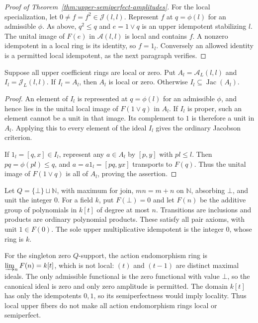 \begin{proof}[Proof of Theorem~\ref{thm:upper-semiperfect-amplitudes}]
For the local specialization, let $0\ne f=f^2\in\mathcal J(l,l)$.
Represent $f$ at $q=\phi(l)$ for an admissible $\phi$. As above,
$q^2\leq q$ and $e=1\vee q$ is an upper idempotent stabilizing
$l$. The unital image of $F(e)$ in $\mathcal A(l,l)$ is local
and contains $f$. A nonzero idempotent in a local ring is its
identity, so $f=1_l$. Conversely an allowed identity is a
permitted local idempotent, as the next paragraph verifies.
\end{proof}

\begin{corollary}
\label{cor:upper-local-diagonal}
Suppose all upper coefficient rings are local or zero. Put
$A_l=\mathcal A_L(l,l)$ and $I_l=\mathcal J_L(l,l)$.
If $I_l=A_l$, then $A_l$ is local or zero. Otherwise
$I_l\subseteq\operatorname{Jac}(A_l)$.
\end{corollary}
\begin{proof}
An element of $I_l$ is represented at $q=\phi(l)$ for an
admissible $\phi$, and hence lies in the unital local image of
$F(1\vee q)$ in $A_l$. If $I_l$ is proper, such an element
cannot be a unit in that image. Its complement to $1$ is therefore
a unit in $A_l$. Applying this to every element of the ideal
$I_l$ gives the ordinary Jacobson criterion.

If $1_l=[q,x]\in I_l$, represent any $a\in A_l$ by $[p,y]$
with $pl\leq l$. Then $pq=\phi(pl)\leq q$, and
$a=a1_l=[pq,yx]$ transports to $F(q)$. Thus the unital image of
$F(1\vee q)$ is all of $A_l$, proving the assertion.
\end{proof}

\begin{example}
\label{ex:upper-local-action-boundary}
Let $Q=\{\bot\}\sqcup\mathbb N$, with maximum for join,
$m n=m+n$ on $\mathbb N$, absorbing $\bot$, and unit the integer
$0$. For a field $k$, put $F(\bot)=0$ and let $F(n)$ be the
additive group of polynomials in $k[t]$ of degree at most $n$.
Transitions are inclusions and products are ordinary polynomial
products. These satisfy all pair axioms, with unit $1\in F(0)$.
The sole upper multiplicative idempotent is the integer $0$, whose
ring is $k$.

For the singleton zero $Q$-support, the action endomorphism ring is
$\varinjlim_nF(n)=k[t]$, which is not local: $(t)$ and $(t-1)$ are
distinct maximal ideals. The only admissible functional is the
zero functional with value $\bot$, so the canonical ideal is zero
and only zero amplitude is permitted. The domain $k[t]$ has only the idempotents $0,1$, so its
semiperfectness would imply locality. Thus local upper fibers do
not make all action endomorphism rings local or semiperfect.
\end{example}

